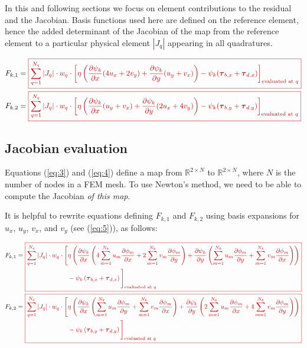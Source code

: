 \documentclass{amsart}
\newcommand{\diff}[2]{\ensuremath{\frac{\partial #1}{\partial #2}}}
\newcommand{\sumQ}{\ensuremath{\sum_{q = 1}^{N_q}}}
\newcommand{\diffbasisexpansion}[3]{\ensuremath{\sum_{#3 = 1}^{N_k} {#1}_{#3} \diff{\phi_{#3}}{#2} }}
\newcommand{\UX}{\diffbasisexpansion{u}{x}{m}}
\newcommand{\UY}{\diffbasisexpansion{u}{y}{m}}
\newcommand{\VX}{\diffbasisexpansion{v}{x}{m}}
\newcommand{\VY}{\diffbasisexpansion{v}{y}{m}}
\newcommand{\basalshearstress}[1]{\boldsymbol{\tau}_{b#1}}
\newcommand{\taubx}{\basalshearstress{,x}}
\newcommand{\tauby}{\basalshearstress{,y}}
\newcommand{\drivingstress}[1]{\boldsymbol{\tau}_{d#1}}
\newcommand{\taudx}{\drivingstress{,x}}
\newcommand{\taudy}{\drivingstress{,y}}
\newcommand{\highlight}[1]{{\color{red!80!black} \fbox{$ \displaystyle #1 $} }}
\newcommand{\R}{\mathbb{R}}
\begin{document}
In this and following sections we focus on element contributions to the residual and the Jacobian. Basis functions used here are defined on the reference element, hence the added determinant of the Jacobian of the map from the reference element to a particular physical element $|J_q|$ appearing in all quadratures.

\begin{align}
  \label{eq:3}
  F_{k,1} & = \highlight{ \sumQ |J_q| \cdot w_q\cdot \left[ \eta \left( \diff{\psi_k}{x} (4 u_x + 2 v_y) + \diff{\psi_k}{y} (u_y + v_x) \right) - \psi_k (\taubx + \taudx) \right]_{\text{evaluated at } q} }\\
  \label{eq:4}
  F_{k,2} & = \highlight{ \sumQ |J_q| \cdot w_q\cdot \left[ \eta \left( \diff{\psi_k}{x} (u_y + v_x) + \diff{\psi_k}{y} (2 u_x + 4 v_y) \right) - \psi_k (\tauby + \taudy) \right]_{\text{evaluated at } q} }
\end{align}


\subsection{Jacobian evaluation}
\label{sec-3-2}

Equations (\ref{eq:3}) and (\ref{eq:4}) define a map from $\R^{2\times N}$ to $\R^{2\times N}$, where $N$ is the number of nodes in a FEM mesh. To use Newton's method, we need to be able to compute the Jacobian \emph{of this map}.

It is helpful to rewrite equations defining $F_{k,1}$ and $F_{k,2}$ using basis expansions for $u_x$, $u_y$, $v_x$, and $v_y$ (see (\ref{eq:5})), as follows:

\begin{align*}
  F_{k,1} &= \highlight{
            \begin{aligned}[t]
              \sumQ |J_q| \cdot w_q\cdot \Bigg[ &\eta \left(\diff{\psi_k}{x} \left(4 \UX + 2 \VY\right)
                + \diff{\psi_k}{y} \left(\UY + \VX\right)\right) \\
              & - \psi_k \left(\taubx + \taudx\right) \Bigg]_{\text{evaluated at } q}\\
            \end{aligned} }\\
  F_{k,2} &= \highlight{
            \begin{aligned}[t]
              \sumQ |J_q| \cdot w_q\cdot \Bigg[ &\eta \left(\diff{\psi_k}{x} \left(\UY + \VX\right)
                + \diff{\psi_k}{y} \left(2 \UX + 4 \VY\right) \right) \\
              & - \psi_k \left(\tauby + \taudy\right) \Bigg]_{\text{evaluated at } q}\\
            \end{aligned}}
\end{align*}
\end{document}
